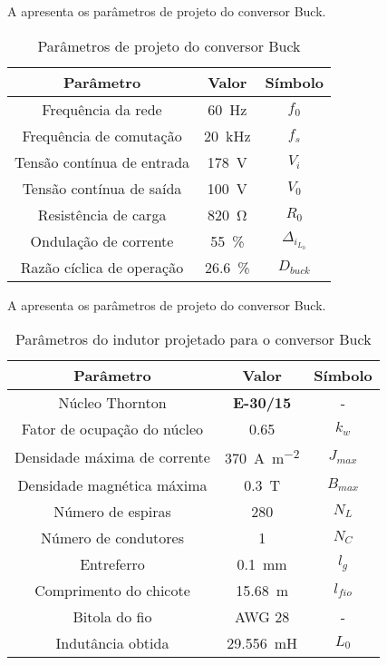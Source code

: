 A  apresenta os parâmetros de projeto do conversor Buck.
\begin{table}[!ht]
	\centering
	\caption{Parâmetros de projeto do conversor Buck}
	\label{tab:parametrosBuck}
	\begin{tabular}{@{}ccc@{}}
		\toprule
		\textbf{Parâmetro} & \textbf{Valor} & \textbf{Símbolo} \\ \midrule			
		Frequência  da rede        & \SI{60}{\hertz}     & $f_0$  \\		
		Frequência de comutação        & \SI{20}{\kilo\hertz}     & $f_s$  \\	
		Tensão contínua de entrada         &  \SI{178}{\V}      & $V_i$  \\
		Tensão contínua de saída         &  \SI{100}{\V}      & $V_0$  \\
		Resistência de carga        & \SI{820}{\ohm}      & $R_0$  \\
		Ondulação de corrente       & \SI{55}{\%}    & $\Delta_{i_{L_0}}$    \\ 
		Razão cíclica de operação       & \SI{26.6}{\%}    & $D_{buck}$    \\  \bottomrule	
	\end{tabular}
\end{table}


A  apresenta os parâmetros de projeto do conversor Buck.
\begin{table}[!ht]
	\centering
	\caption{Parâmetros do indutor projetado para o conversor Buck}
	\label{tab:IndutorBuck}
	\begin{tabular}{@{}ccc@{}}
		\toprule
		\textbf{Parâmetro} & \textbf{Valor} & \textbf{Símbolo} \\ \midrule	
			Núcleo  Thornton      & \textbf{E-30/15}    & -  \\				
		Fator de ocupação do núcleo & \SI{0.65}{}     & $k_w$  \\
		Densidade máxima de corrente & \SI{370}{\ampere\per\square\meter}     & $J_{max}$  \\
		Densidade magnética máxima & \SI{0.3}{\tesla}     & $B_{max}$  \\			
		Número de espiras        & \SI{280}{}     & $N_L$  \\	
		Número de condutores        & \SI{1}{}     & $N_C$  \\		
		Entreferro         &  \SI{0.1}{\mm}      & $l_g$  \\
		Comprimento do chicote        &  \SI{15.68}{\m}      & $l_{fio}$  \\
		Bitola do fio        &  AWG 28     & -  \\
		Indutância obtida         & \SI{29.556}{\milli\henry}     & $L_0$  \\ \bottomrule	
	\end{tabular}
\end{table}



